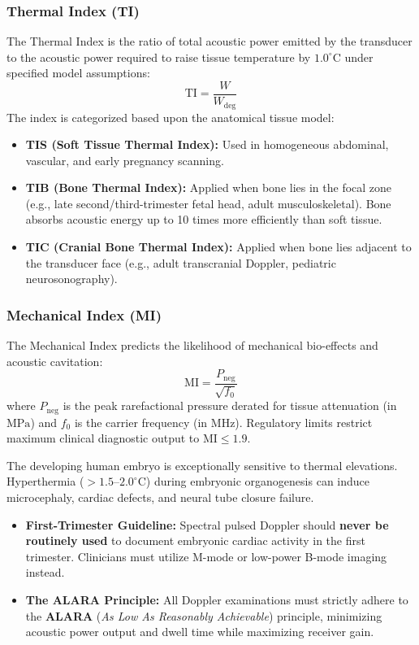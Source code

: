 \documentclass[11pt,a4paper]{article}
\begin{document}
\subsubsection{Thermal Index (TI)}
The Thermal Index is the ratio of total acoustic power emitted by the transducer to the acoustic power required to raise tissue temperature by $1.0^\circ\text{C}$ under specified model assumptions:
\begin{equation}
    \text{TI} = \frac{W}{W_{\text{deg}}}
\end{equation}
The index is categorized based upon the anatomical tissue model:
\begin{itemize}[leftmargin=*]
    \item \textbf{TIS (Soft Tissue Thermal Index):} Used in homogeneous abdominal, vascular, and early pregnancy scanning.
    \item \textbf{TIB (Bone Thermal Index):} Applied when bone lies in the focal zone (e.g., late second/third-trimester fetal head, adult musculoskeletal). Bone absorbs acoustic energy up to 10 times more efficiently than soft tissue.
    \item \textbf{TIC (Cranial Bone Thermal Index):} Applied when bone lies adjacent to the transducer face (e.g., adult transcranial Doppler, pediatric neurosonography).
\end{itemize}

\subsubsection{Mechanical Index (MI)}
The Mechanical Index predicts the likelihood of mechanical bio-effects and acoustic cavitation:
\begin{equation}
    \text{MI} = \frac{P_{\text{neg}}}{\sqrt{f_0}}
\end{equation}
where $P_{\text{neg}}$ is the peak rarefactional pressure derated for tissue attenuation (in $\text{MPa}$) and $f_0$ is the carrier frequency (in $\text{MHz}$). Regulatory limits restrict maximum clinical diagnostic output to $\text{MI} \le 1.9$.

\begin{acousticbio}
The developing human embryo is exceptionally sensitive to thermal elevations. Hyperthermia ($> 1.5\text{--}2.0^\circ\text{C}$) during embryonic organogenesis can induce microcephaly, cardiac defects, and neural tube closure failure. 
\begin{itemize}[leftmargin=*]
    \item \textbf{First-Trimester Guideline:} Spectral pulsed Doppler should \textbf{never be routinely used} to document embryonic cardiac activity in the first trimester. Clinicians must utilize M-mode or low-power B-mode imaging instead.
    \item \textbf{The ALARA Principle:} All Doppler examinations must strictly adhere to the \textbf{ALARA} (\textit{As Low As Reasonably Achievable}) principle, minimizing acoustic power output and dwell time while maximizing receiver gain.
\end{itemize}
\end{acousticbio}
\end{document}

